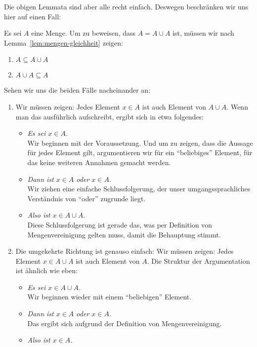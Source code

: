 Die obigen Lemmata sind aber alle recht einfach.
%
Deswegen beschränken wir uns hier auf einen Fall:
%
\begin{beweis}
  Es sei $A$ eine Menge. Um zu beweisen, dass $A=A\cup A$ ist,
  müssen wir nach Lemma~\ref{lem:mengen-gleichheit} zeigen:
  \begin{enumerate}
  \item $A\subseteq A\cup A$
  \item $A\cup A\subseteq A$
  \end{enumerate}
  Sehen wir uns die beiden Fälle nacheinander an:
%
  \begin{enumerate}
  \item Wir müssen zeigen: Jedes Element $x\in A$ ist auch Element von
    $A\cup A$.
    Wenn man das ausführlich aufschreibt, ergibt sich in etwa
    folgendes:
    \begin{itemize}
    \item \emph{Es sei $x\in A$.} \\
      Wir beginnen mit der Voraussetzung.
      Und um zu zeigen, dass die Aussage für jedes Element gilt,
      argumentieren wir für ein "`beliebiges"' Element, für das keine
      weiteren Annahmen gemacht werden.
    \item \emph{Dann ist $x\in A$ oder $x\in A$.}\\
      Wir ziehen eine einfache Schlussfolgerung, der unser
      umgangssprachliches Verständnis von "`oder"' zugrunde liegt.
    \item \emph{Also ist $x\in A\cup A$.} \\
      Diese Schlussfolgerung ist gerade das, was per Definition von
      Mengenvereinigung gelten muss, damit die Behauptung stimmt.
    \end{itemize}
  \item Die umgekehrte Richtung ist genauso einfach:
    Wir müssen zeigen: Jedes Element $x\in A\cup A$ ist auch Element
    von $A$.
    Die Struktur der Argumentation ist ähnlich wie eben:
    \begin{itemize}
    \item \emph{Es sei $x\in A\cup A$.} \\
      Wir beginnen wieder mit einem "`beliebigen"' Element.
    \item \emph{Dann ist $x\in A$ oder $x\in A$.} \\
      Das ergibt sich aufgrund der Definition von Mengenvereinigung.
    \item \emph{Also ist $x\in A$.} \\
    \end{itemize}
  \end{enumerate}
\end{beweis}
